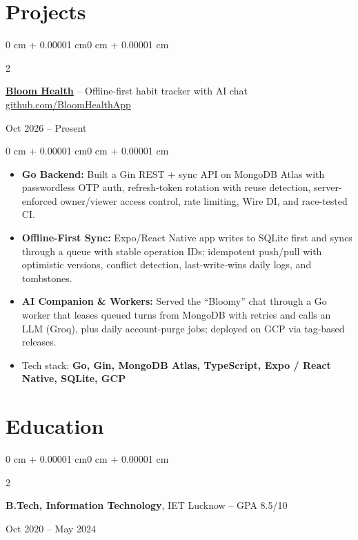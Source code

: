 \documentclass[11pt, letterpaper]{extarticle}
\newenvironment{highlights}{
    \begin{itemize}[
        topsep=0.01 cm,
        parsep=0pt,
        partopsep=0pt,
        itemsep=0pt,
        leftmargin=0 cm + 10pt
    ]
}{
    \end{itemize}
}
\newenvironment{onecolentry}{
    \begin{adjustwidth}{0 cm + 0.00001 cm}{0 cm + 0.00001 cm}
}{
    \end{adjustwidth}
}
\newenvironment{twocolentry}[2][]{
    \onecolentry
    \def\secondColumn{#2}
    \setcolumnwidth{\fill, 4.5 cm}
    \begin{paracol}{2}
}{
    \switchcolumn \raggedleft \secondColumn
    \end{paracol}
    \endonecolentry
}
\begin{document}
    \section{Projects}
    \begin{twocolentry}{Oct 2026 – Present}
    \textbf{\href{https://github.com/BloomHealthApp}{Bloom Health}} -- Offline-first habit tracker with AI chat \textbar{} \href{https://github.com/BloomHealthApp}{github.com/BloomHealthApp}
    \end{twocolentry}
    \vspace{0.05 cm}
    \begin{onecolentry}
        \begin{highlights}
            \item \textbf{Go Backend:} Built a Gin REST + sync API on MongoDB Atlas with passwordless OTP auth, refresh-token rotation with reuse detection, server-enforced owner/viewer access control, rate limiting, Wire DI, and race-tested CI.
            \item \textbf{Offline-First Sync:} Expo/React Native app writes to SQLite first and syncs through a queue with stable operation IDs; idempotent push/pull with optimistic versions, conflict detection, last-write-wins daily logs, and tombstones.
            \item \textbf{AI Companion \& Workers:} Served the ``Bloomy'' chat through a Go worker that leases queued turns from MongoDB with retries and calls an LLM (Groq), plus daily account-purge jobs; deployed on GCP via tag-based releases.
            \item {Tech stack: \textbf{Go, Gin, MongoDB Atlas, TypeScript, Expo / React Native, SQLite, GCP}}
        \end{highlights}
    \end{onecolentry}

    \section{Education}
    \begin{twocolentry}{Oct 2020 – May 2024}
    \textbf{B.Tech, Information Technology}, IET Lucknow -- GPA 8.5/10
    \end{twocolentry}
\end{document}
